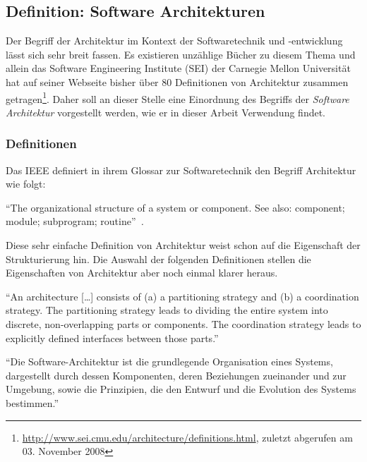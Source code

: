 \subsection{Definition: Software Architekturen} %
\label{sub:definition_software_architekturen}

  Der Begriff der Architektur im Kontext der Softwaretechnik und -entwicklung lässt sich sehr breit fassen. Es existieren unzählige Bücher zu diesem Thema und allein das Software Engineering Institute (SEI) der Carnegie Mellon Universität hat auf seiner Webseite bisher über 80 Definitionen von Architektur zusammen getragen\footnote{\url{http://www.sei.cmu.edu/architecture/definitions.html}, zuletzt abgerufen am 03. November 2008}. Daher soll an dieser Stelle eine Einordnung des Begriffs der \emph{Software Architektur} vorgestellt werden, wie er in dieser Arbeit Verwendung findet.
  
\subsubsection{Definitionen} %
\label{ssub:definitionen_architektur}

  Das IEEE definiert in ihrem Glossar zur Softwaretechnik den Begriff Architektur wie folgt:
  
  \begin{definition}\label{def:architektur_ieee}
    "`The organizational structure of a system or component. See also: component; module; subprogram; routine"'~\emph{\citep{ieee90sg}.}
  \end{definition}
  
  Diese sehr einfache Definition von Architektur weist schon auf die Eigenschaft der Strukturierung hin. Die Auswahl der folgenden Definitionen stellen die Eigenschaften von Architektur aber noch einmal klarer heraus.
  
  \begin{definition}\label{def:architektur_crispen}
    "`An architecture [\ldots] consists of (a) a partitioning strategy and (b) a coordination strategy. The partitioning strategy leads to dividing the entire system into discrete, non-overlapping parts or components. The coordination strategy leads to explicitly defined interfaces between those parts."'~\emph{\citep[S. 272]{crispen1994sm}}
  \end{definition}
  
  \begin{definition}\label{def:architektur_reussner_et_al}
    "`Die Software-Architektur ist die grundlegende Organisation eines Systems, dargestellt durch dessen Komponenten, deren Beziehungen zueinander und zur Umgebung, sowie die Prinzipien, die den Entwurf und die Evolution des Systems bestimmen."'~\emph{\citep[S. 1]{handbuch_der_software_architektur}}
  \end{definition}
  
